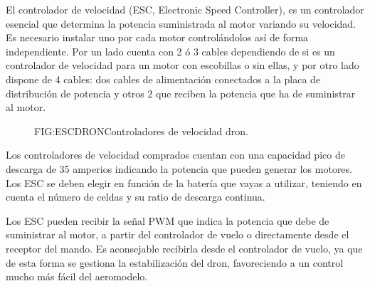  
 El controlador de velocidad (ESC, Electronic Speed Controller), es un controlador esencial que determina la potencia suministrada al motor variando su velocidad. Es necesario instalar uno por cada motor controlándolos así de forma independiente.
 Por un lado cuenta con 2 ó 3 cables dependiendo de si es un controlador de velocidad para un motor con escobillas o sin ellas, y por otro lado dispone de 4 cables: dos cables de alimentación conectados a la placa de distribución de potencia y otros 2 que reciben la potencia que ha de suministrar al motor.
 
 \begin{figure}{FIG:ESCDRON}{Controladores de velocidad dron.}
\end{figure}
 
 Los controladores de velocidad comprados cuentan con una capacidad pico de descarga de 35 amperios indicando la potencia que pueden generar los motores. Los ESC se deben elegir en función de la batería que vayas a utilizar, teniendo en cuenta el número de celdas y su ratio de descarga continua.
 
 Los ESC pueden recibir la señal PWM que indica la potencia que debe de suministrar al motor, a partir del controlador de vuelo o directamente desde el receptor del mando. Es aconsejable recibirla desde el controlador de vuelo, ya que de esta forma se gestiona la estabilización del dron, favoreciendo a un control mucho más fácil del aeromodelo. \cite{OscarSerrano}

 